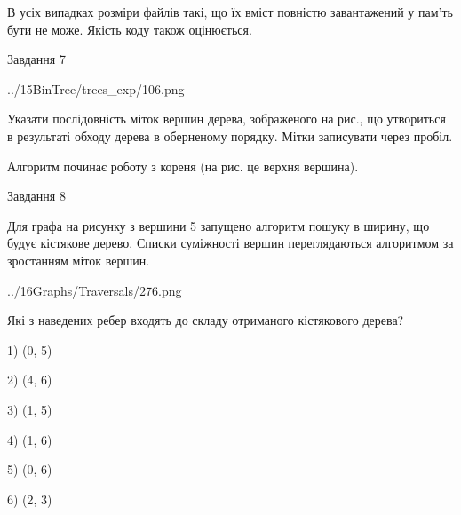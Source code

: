 \documentclass[12pt, ukrainian]{article}
\begin{document}
{В усіх випадках розміри файлів такі, що їх вміст повністю завантажений у пам'ть бути не може. Якість коду також оцінюється.



\vspace{10mm}\par

\newpage
\begin{minipage}[t]{9.7cm}
               
{\begin{center}Завдання {7}\end{center}}
\vspace{-4mm}

\begin{center}
	{../15BinTree/trees_exp/106.png}
\end{center}
Указати послідовність міток вершин дерева, зображеного на рис., що утвориться в результаті обходу дерева в оберненому порядку. Мітки записувати через пробіл.\par Алгоритм починає роботу з кореня (на рис. це верхня вершина).\par

\end{minipage}
\vline \hspace{8mm}
\begin{minipage}[t]{8.0cm}
               
{\begin{center}Завдання {8}\end{center}}
\vspace{-4mm}
Для графа на рисунку з вершини 5 запущено алгоритм пошуку в ширину, що будує кістякове дерево. Списки суміжності вершин переглядаються алгоритмом за зростанням міток вершин.\par
\begin{center}
	{../16Graphs/Traversals/276.png}
\end{center}
\par Які з наведених ребер входять до складу отриманого кістякового дерева?\par
1) (0, 5)\par
2) (4, 6)\par
3) (1, 5)\par
4) (1, 6)\par
5) (0, 6)\par
6) (2, 3)\par
{\vskip 15pt} \par


\end{minipage}}
\end{document}
